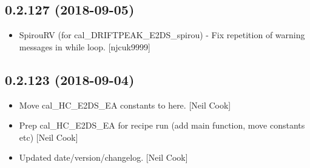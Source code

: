 \documentclass[a4paper,10pt,english]{report}
\begin{document}
\subsection{0.2.127 (2018-09-05)}
\label{\detokenize{misc/changelog:id337}}\begin{itemize}
\item {} 
SpirouRV (for cal\_DRIFTPEAK\_E2DS\_spirou) - Fix repetition of warning
messages in while loop. {[}njcuk9999{]}

\end{itemize}


\subsection{0.2.123 (2018-09-04)}
\label{\detokenize{misc/changelog:id338}}\begin{itemize}
\item {} 
Move cal\_HC\_E2DS\_EA constants to here. {[}Neil Cook{]}

\item {} 
Prep cal\_HC\_E2DS\_EA for recipe run (add main function, move constants
etc) {[}Neil Cook{]}

\item {} 
Updated date/version/changelog. {[}Neil Cook{]}

\end{itemize}
\end{document}
